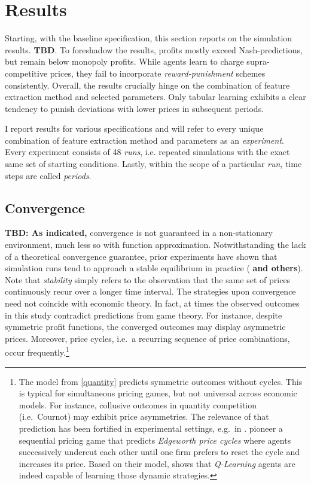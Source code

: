 
\section{Results}
Starting, with the baseline specification, this section reports on the simulation results. \textbf{TBD}. To foreshadow the results, profits mostly exceed Nash-predictions, but remain below monopoly profits. While agents learn to charge supra-competitive prices, they fail to incorporate \emph{reward-punishment} schemes consistently. Overall, the results crucially hinge on the combination of feature extraction method and selected parameters. Only tabular learning exhibits a clear tendency to punish deviations with lower prices in subsequent periods.

I report results for various specifications and will refer to every unique combination of feature extraction method and parameters as an \emph{experiment}. Every experiment consists of 48 \emph{runs}, i.e. repeated simulations with the exact same set of starting conditions. Lastly, within the scope of a particular \emph{run}, time steps are called \emph{periods}.

\subsection{Convergence}\label{convergence}

\textbf{TBD: As indicated,} convergence is not guaranteed in a non-stationary environment, much less so with function approximation. Notwithstanding the lack of a theoretical convergence guarantee, prior experiments have shown that simulation runs tend to approach a stable equilibrium in practice (\cite{calvano_artificial_2019} \textbf{and others}). Note that \emph{stability} simply refers to the observation that the same set of prices continuously recur over a longer time interval. The strategies upon convergence need not coincide with economic theory. In fact, at times the observed outcomes in this study contradict predictions from game theory. For instance, despite symmetric profit functions, the converged outcomes may display asymmetric prices. Moreover, price cycles, i.e.\ a recurring sequence of price combinations, occur frequently.\footnote{The model from \autoref{quantity} predicts symmetric outcomes without cycles. This is typical for simultaneous pricing games, but not universal across economic models. For instance, collusive outcomes in quantity competition (i.e.\ Cournot) may exhibit price asymmetries. The relevance of that prediction has been fortified in experimental settings, e.g.\ in \textcite{fischer_collusion_2019}. \textcite{maskine-tirole} pioneer a sequential pricing game that predicts \emph{Edgeworth price cycles} where agents successively undercut each other until one firm prefers to reset the cycle and increases its price. Based on their model, \textcite{klein_autonomous_2019} shows that \emph{Q-Learning} agents are indeed capable of learning those dynamic strategies.}


